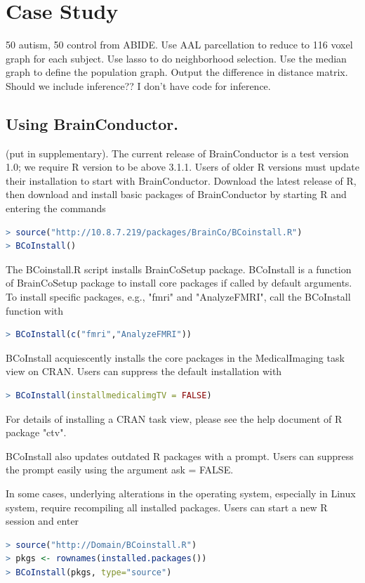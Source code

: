 \documentclass{nature}
\begin{document}
\section{Case Study}

{\color{red}50 autism, 50 control from ABIDE. Use AAL parcellation to reduce to 116 voxel graph
for each subject. Use lasso to do neighborhood selection. Use the median graph to
define the population graph. Output the difference in distance matrix. Should we
include inference?? I don't have code for inference.}

\newpage
\appendix

\begin{methods}
\section{Using BrainConductor.} 
(put in supplementary). The current release of BrainConductor is a test version
1.0; we require R version to be above 3.1.1. Users of older R versions must
update their installation to start with BrainConductor. Download the latest
release of R, then download and install basic packages of BrainConductor by
starting R and entering the commands
\begin{lstlisting}[language = R]
> source("http://10.8.7.219/packages/BrainCo/BCoinstall.R")
> BCoInstall()
\end{lstlisting}
The BCoinstall.R script installs BrainCoSetup package. BCoInstall is a function
of BrainCoSetup package to install core packages if called by default arguments.
To install specific packages, e.g., "fmri" and "AnalyzeFMRI", call the
BCoInstall function with
\begin{lstlisting}[language = R]
> BCoInstall(c("fmri","AnalyzeFMRI"))
\end{lstlisting}
BCoInstall acquiescently installs the core packages in the MedicalImaging task
view on CRAN. Users can suppress the default installation with
\begin{lstlisting}[language = R]
> BCoInstall(installmedicalimgTV = FALSE)
\end{lstlisting}
For details of installing a CRAN task view, please see the help document of R
package "ctv".   

BCoInstall also updates outdated R packages with a prompt. Users can suppress
the prompt easily using the argument ask = FALSE. 

In some cases, underlying alterations in the operating system, especially in
Linux system, require recompiling all installed packages. Users can start a new
R session and enter
\begin{lstlisting}[language = R]
> source("http://Domain/BCoinstall.R")
> pkgs <- rownames(installed.packages())
> BCoInstall(pkgs, type="source")
\end{lstlisting}


\end{methods}
\end{document}
